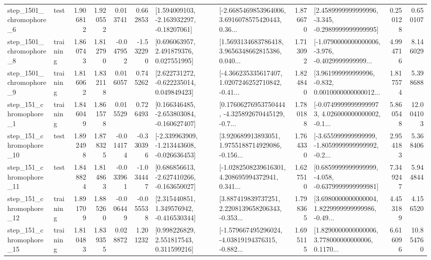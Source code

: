 \begin{tabular}{llrrrrllrlrr}
  step\_1501\_chromophore\_6 &      test &      1.906812 &    1.920552 &      0.013741 &  0.662853 &    [1.594009103, -2.163932297, -0.18207061] &  [-2.6685469853964006, 3.6916078575420443, 0.36... &       1.876670 &  [2.4589999999999996, -3.345, -0.2989999999999995] &            0.250128 &          0.650107 \\
  step\_1501\_chromophore\_8 &  training &      1.860743 &    1.812790 &     -0.047952 & -1.532290 &     [0.696063957, 2.491879376, 0.027551995] &  [1.5693134683786418, 3.9656348662815386, 0.040... &       1.713092 &  [-1.0790000000000006, -3.976, -0.4029999999999... &            4.994716 &          8.146029 \\
  step\_1501\_chromophore\_9 &  training &      1.816062 &    1.832118 &      0.016057 &  0.745262 &    [2.622731272, -0.622235014, 0.049849423] &  [-4.366235335617407, 1.0207246252710842, -0.41... &       1.824840 &  [3.961999999999996, -0.832, 0.0010000000000012... &            1.817574 &          5.398688 \\
   step\_151\_chromophore\_1 &  training &      1.846049 &    1.861578 &      0.015529 &  0.726493 &   [0.166346485, -2.653803084, -0.160627407] &  [0.17606276953750444, -4.325892670445129, -0.7... &       1.780188 &  [-0.07499999999999973, 4.026000000000002, -0.1... &            5.860548 &         12.004103 \\
  step\_151\_chromophore\_10 &      test &      1.892498 &    1.878325 &     -0.014174 & -0.330396 &  [-2.339963909, -1.213443608, -0.026636453] &  [3.920689913893051, 1.9755188714929086, -0.156... &       1.764330 &  [-3.655999999999999, -1.8059999999999992, -0.2... &            2.954183 &          5.368406 \\
  step\_151\_chromophore\_11 &      test &      1.848824 &    1.814863 &     -0.033961 & -1.034447 &   [0.686856613, -2.627410266, -0.163650027] &  [-1.0282508239616301, 4.208695994372941, 0.341... &       1.627510 &  [0.6859999999999999, -4.058, -0.6379999999999981] &            7.349247 &          5.944844 \\
  step\_151\_chromophore\_12 &  training &      1.891709 &    1.885260 &     -0.006449 & -0.055538 &    [2.315440851, 1.349576942, -0.416530344] &  [3.887419839737251, 2.2208139658206343, -0.353... &       1.798365 &  [3.6980000000000004, 1.8229999999999986, -0.49... &            4.453189 &          4.156520 \\
  step\_151\_chromophore\_15 &  training &      1.810483 &    1.839355 &      0.028872 &  1.201232 &     [0.998226829, 2.551817543, 0.311599216] &  [-1.579667495296024, -4.03819194376315, -0.882... &       1.695115 &  [1.8290000000000006, 3.778000000000006, 0.1170... &            6.616096 &         10.854760 \\

\end{tabular}
